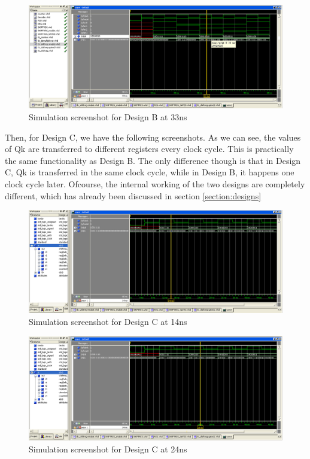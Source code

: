 \documentclass[11pt,a4paper]{article}
\begin{document}
\begin{figure}[htp]
\centering
\includegraphics[length = 4in,width = 6.5in]{./images/simsre3.png}
\caption{Simulation screenshot for Design B at 33ns}
\end{figure}

\newpage
Then, for Design C, we have the following screenshots. As we can see, the values of Qk are transferred to different registers every clock cycle. This is practically the same functionality as Design B. The only difference though is that in Design C, Qk is transferred in the same clock cycle, while in Design B, it happens one clock cycle later. Ofcourse, the internal working of the two designs are completely different, which has already been discussed in section \ref{section:designs}

\begin{figure}[htp]
\centering
\includegraphics[length = 4in,width = 6.5in]{./images/simsrg1.png}
\caption{Simulation screenshot for Design C at 14ns}
\end{figure}

\begin{figure}[htp]
\centering
\includegraphics[length = 4in,width = 6.5in]{./images/simsrg2.png}
\caption{Simulation screenshot for Design C at 24ns}
\end{figure}
\end{document}
